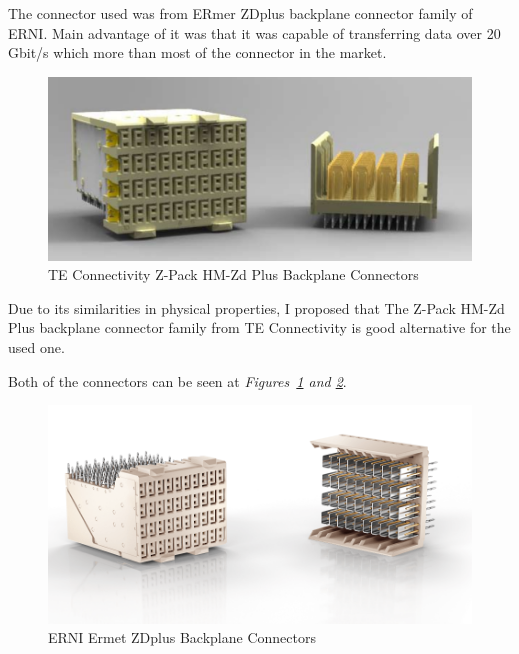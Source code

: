 	The connector used was from ERmer ZDplus backplane connector family of ERNI. Main advantage of it was that it was capable of transferring data over 20 Gbit/s which more than most of the connector in the market.
	
\begin{figure}[H]
	\center
	\setlength{\unitlength}{\textwidth} 
	\includegraphics[width=0.9\unitlength]{zpack}
	\caption{\label{fig:zpack}TE Connectivity Z-Pack HM-Zd Plus Backplane Connectors \cite{teconnec}}
\end{figure}



	 

	Due to its similarities in physical properties, I proposed that The Z-Pack HM-Zd Plus backplane connector family from TE Connectivity is good alternative for the used one.
	
	Both of the connectors can be seen at \textit{Figures~\ref{fig:zpack} and \ref{fig:ermetzd}}.\cite{ermetzd}  \cite{teconnec} 

\begin{figure}[H]
	\center
	\setlength{\unitlength}{\textwidth} 
	\includegraphics[width=0.9\unitlength]{ermetzd2}
	\caption{\label{fig:ermetzd} ERNI Ermet ZDplus Backplane Connectors \cite{ermetzd} }
\end{figure}



